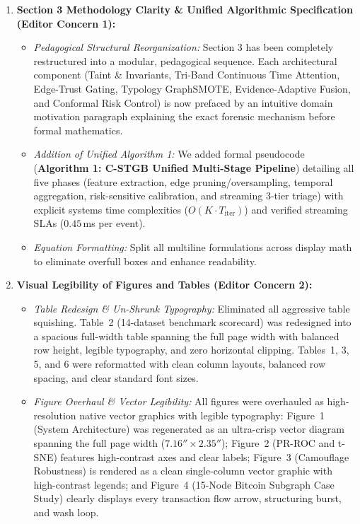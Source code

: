 \documentclass[9.5pt,a4paper]{article}
\begin{document}
\begin{enumerate}[label=\textbf{\arabic*.}]
    \item \textbf{Section 3 Methodology Clarity \& Unified Algorithmic Specification (Editor Concern 1):}
    \begin{itemize}
        \item \textit{Pedagogical Structural Reorganization:} Section 3 has been completely restructured into a modular, pedagogical sequence. Each architectural component (Taint \& Invariants, Tri-Band Continuous Time Attention, Edge-Trust Gating, Typology GraphSMOTE, Evidence-Adaptive Fusion, and Conformal Risk Control) is now prefaced by an intuitive domain motivation paragraph explaining the exact forensic mechanism before formal mathematics.
        \item \textit{Addition of Unified Algorithm 1:} We added formal pseudocode (\textbf{Algorithm 1: C-STGB Unified Multi-Stage Pipeline}) detailing all five phases (feature extraction, edge pruning/oversampling, temporal aggregation, risk-sensitive calibration, and streaming 3-tier triage) with explicit systems time complexities ($O(K \cdot T_{\text{iter}})$) and verified streaming SLAs ($0.45$\,ms per event).
        \item \textit{Equation Formatting:} Split all multiline formulations across display math to eliminate overfull boxes and enhance readability.
    \end{itemize}

    \item \textbf{Visual Legibility of Figures and Tables (Editor Concern 2):}
    \begin{itemize}
        \item \textit{Table Redesign \& Un-Shrunk Typography:} Eliminated all aggressive table squishing. Table~2 (14-dataset benchmark scorecard) was redesigned into a spacious full-width table spanning the full page width with balanced row height, legible typography, and zero horizontal clipping. Tables~1, 3, 5, and 6 were reformatted with clean column layouts, balanced row spacing, and clear standard font sizes.
        \item \textit{Figure Overhaul \& Vector Legibility:} All figures were overhauled as high-resolution native vector graphics with legible typography: Figure~1 (System Architecture) was regenerated as an ultra-crisp vector diagram spanning the full page width ($7.16'' \times 2.35''$); Figure~2 (PR-ROC and t-SNE) features high-contrast axes and clear labels; Figure~3 (Camouflage Robustness) is rendered as a clean single-column vector graphic with high-contrast legends; and Figure~4 (15-Node Bitcoin Subgraph Case Study) clearly displays every transaction flow arrow, structuring burst, and wash loop.
    \end{itemize}


\end{enumerate}
\end{document}
